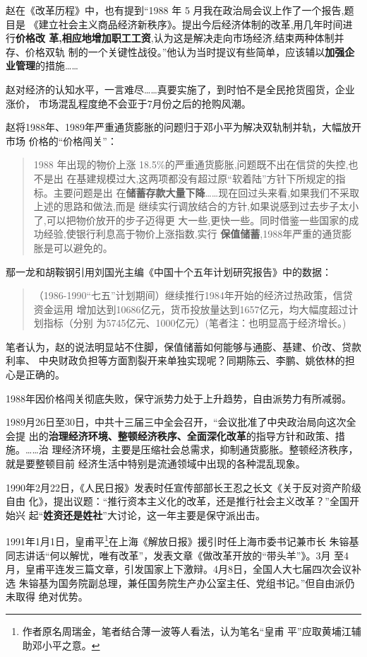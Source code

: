 赵在《改革历程》中，也有提到“1988 年 5 月我在政治局会议上作了一个报告,题目是
《建立社会主义商品经济新秩序》。提出今后经济体制的改革,用几年时间进行\textbf{价格改
  革,相应地增加职工工资},认为这是解决走向市场经济,结束两种体制并存、价格双轨
制的一个关键性战役。”他认为当时提议有些简单，应该辅以\textbf{加强企业管理}的措施……

赵对经济的认知水平，一言难尽……真要实施了，到时怕不是全民抢货囤货，企业涨价，
市场混乱程度绝不会亚于7月份之后的抢购风潮。

赵将1988年、1989年严重通货膨胀的问题归于邓小平为解决双轨制并轨，大幅放开市场
价格的“价格闯关”：
\begin{quotation}
  1988 年出现的物价上涨 18.5\%的严重通货膨胀,问题既不出在信贷的失控,也不是出
  在基建规模过大,这两项都没有超过原“软着陆”方针下所规定的指标。主要问题是出
  在\textbf{储蓄存款大量下降}……现在回过头来看,如果我们不采取上述的思路和做法,而是
  继续实行调放结合的方针,如果说感到过去步子太小了,可以把物价放开的步子迈得更
  大一些,更快一些。同时借鉴一些国家的成功经验,使银行利息高于物价上涨指数,实行
  \textbf{保值储蓄},1988年严重的通货膨胀是可以避免的。\cite[129]{gaigelicheng}
\end{quotation}

鄢一龙和胡鞍钢引用刘国光主编《中国十个五年计划研究报告》中的数据：
\begin{quotation}
  （1986-1990“七五”计划期间）继续推行1984年开始的经济过热政策，信贷资金运用
  增加达到10686亿元，货币投放量达到1657亿元，均大幅度超过计划指标（分别
  为5745亿元、1000亿元）(笔者注：也明显高于经济增长。)\cite{shiyiwu}
\end{quotation}

笔者认为，赵的说法明显站不住脚，保值储蓄如何能够与通膨、基建、价改、贷款利率、
中央财政负担等方面割裂开来单独实现呢？同期陈云、李鹏、姚依林的担心是正确的。

1988年因价格闯关彻底失败，保守派势力处于上升趋势，自由派势力有所减弱。

1989月26日至30日，中共十三届三中全会召开，“会议批准了中央政治局向这次全会提
出的\textbf{治理经济环境、整顿经济秩序、全面深化改革}的指导方针和政策、措施。……治
理经济环境，主要是压缩社会总需求，抑制通货膨胀。整顿经济秩序，就是要整顿目前
经济生活中特别是流通领域中出现的各种混乱现象。

1990年2月22日，《人民日报》发表时任宣传部部长王忍之长文《关于反对资产阶级自由
化》，提出议题：“推行资本主义化的改革，还是推行社会主义改革？”全国开始兴
起“\textbf{姓资还是姓社}”大讨论，这一年主要是保守派出击。

1991年1月1日，皇甫平\footnote{作者原名周瑞金，笔者结合薄一波等人看法，认为笔名“皇甫
  平”应取黄埔江辅助邓小平之意。}在上海《解放日报》援引时任上海市委书记兼市长
朱镕基同志讲话“何以解忧，唯有改革”，发表文章《做改革开放的“带头羊”》。3月
至4月，皇甫平连发三篇文章，引发国家上下激辩。4月8日，全国人大七届四次会议补选
朱镕基为国务院副总理，兼任国务院生产办公室主任、党组书记。”但自由派仍未取得
绝对优势。

